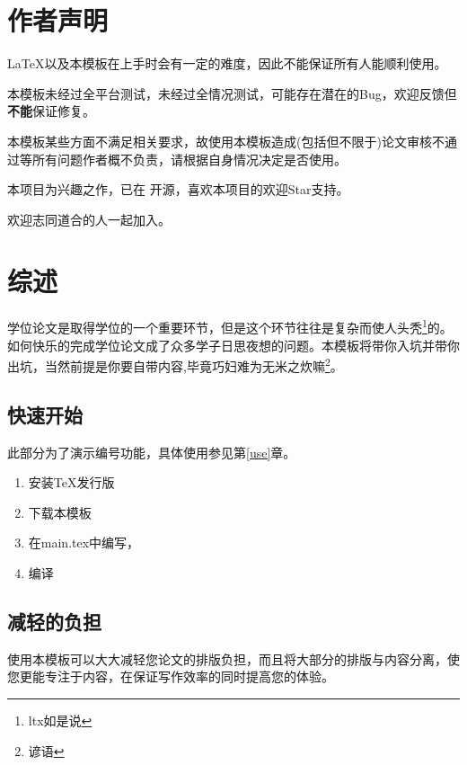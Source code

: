 \documentclass{bucthesis}
\begin{document}
\startmain
\chapter{作者声明}{\par
	\LaTeX{}以及本模板在上手时会有一定的难度，因此不能保证所有人能顺利使用。\par
	本模板未经过全平台测试，未经过全情况测试，可能存在潜在的Bug，欢迎反馈但\textbf{不能}保证修复。\par
	本模板某些方面不满足相关要求，故使用本模板造成(包括但不限于)论文审核不通过等所有问题作者概不负责，请根据自身情况决定是否使用。\par
	本项目为兴趣之作，已在 开源，喜欢本项目的欢迎Star支持。\par
	欢迎志同道合的人一起加入。\par
	}
\chapter{综述}{\par
	学位论文是取得学位的一个重要环节，但是这个环节往往是复杂而使人头秃\footnote{ltx如是说}的。如何快乐的完成学位论文成了众多学子日思夜想的问题。本模板将带你入坑并带你出坑，当然前提是你要自带内容,毕竟巧妇难为无米之炊嘛\footnote{谚语}。\par}
\section{快速开始}{\par
	此部分为了演示编号功能，具体使用参见第\ref{use}章。
	\begin{enumerate}[\hspace{2em}(a)]
		\item 安装\TeX{}发行版
		\item 下载本模板
		\item 在main.tex中编写，
		\item 编译
	\end{enumerate}}
\section{减轻的负担}{\par
	使用本模板可以大大减轻您论文的排版负担，而且将大部分的排版与内容分离，使您更能专注于内容，在保证写作效率的同时提高您的体验。}
\end{document}
